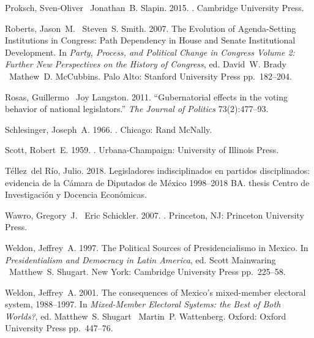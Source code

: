 \documentclass[letter,12pt]{article}
\begin{document}
\begin{thebibliography}{xx}
Proksch, Sven-Oliver \harvardand\ Jonathan~B. Slapin. 2015.
.
\newblock Cambridge University Press.

Roberts, Jason~M. \harvardand\ Steven~S. Smith. 2007.
\newblock The Evolution of Agenda-Setting Institutions in {C}ongress: Path
  Dependency in {H}ouse and {S}enate Institutional Development.  In {\em Party,
  Process, and Political Change in Congress Volume 2: Further New Perspectives
  on the History of Congress}, ed. David~W. Brady \harvardand\ Mathew~D.
  McCubbins.
\newblock Palo Alto:  Stanford University Press pp.~182--204.

Rosas, Guillermo \harvardand\ Joy Langston. 2011.
\newblock ``Gubernatorial effects in the voting behavior of national
  legislators.'' {\em The Journal of Politics} 73(2):477--93.

Schlesinger, Joseph~A. 1966.
.
\newblock Chicago:  Rand McNally.

Scott, Robert~E. 1959.
.
\newblock Urbana-Champaign:  University of Illinois Press.

T\'ellez~del R\'io, Julio. 2018.
\newblock Legisladores indisciplinados en partidos disciplinados: evidencia de
  la {C}\'amara de {D}iputados de {M\'e}xico 1998--2018 {BA}. thesis {C}entro
  de {I}nvestigaci\'on y {D}ocencia {E}con\'omicas.

Wawro, Gregory~J. \harvardand\ Eric Schickler. 2007.
.
\newblock Princeton, NJ:  Princeton University Press.

Weldon, Jeffrey~A. 1997.
\newblock The Political Sources of Presidencialismo in {M}exico.  In {\em
  Presidentialism and Democracy in Latin America}, ed. Scott Mainwaring
  \harvardand\ Matthew~S. Shugart.
\newblock New York:  Cambridge University Press pp.~225--58.

Weldon, Jeffrey~A. 2001.
\newblock The consequences of {{M}exico}'s mixed-member electoral system,
  1988--1997.  In {\em Mixed-Member Electoral Systems: the Best of Both
  Worlds?}, ed. Matthew~S. Shugart \harvardand\ Martin~P. Wattenberg.
\newblock Oxford:  Oxford University Press pp.~447--76.


\end{thebibliography}
\end{document}

